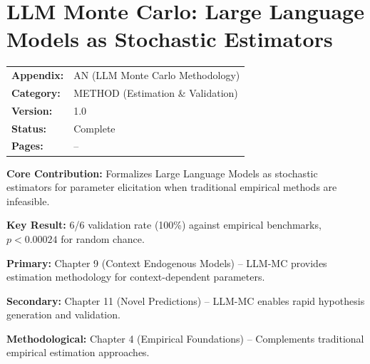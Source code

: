 \section{LLM Monte Carlo: Large Language Models as Stochastic Estimators}
\label{app:llm-monte-carlo}


\begin{tcolorbox}[colback=blue!5!white, colframe=blue!75!black,
    title=\textbf{Appendix LLM1: METHOD-LLMMC}]

\begin{tabular}{@{}ll@{}}
\textbf{Appendix:} & AN (LLM Monte Carlo Methodology) \\
\textbf{Category:} & METHOD (Estimation \& Validation) \\
\textbf{Version:} & 1.0 \\
\textbf{Status:} & Complete \\
\textbf{Pages:} & \pageref{app:llm-monte-carlo}--\pageref{sec:AN-footer} \\
\end{tabular}

\tcblower

\textbf{Core Contribution:} Formalizes Large Language Models as stochastic estimators
for parameter elicitation when traditional empirical methods are infeasible.

\textbf{Key Result:} 6/6 validation rate (100\%) against empirical benchmarks,
$p < 0.00024$ for random chance.

\end{tcolorbox}


\begin{tcolorbox}[colback=gray!10!white, colframe=gray!75!black,
    title=\textbf{Chapter Linkage}]

\textbf{Primary:} Chapter 9 (Context Endogenous Models) -- LLM-MC provides
estimation methodology for context-dependent parameters.

\textbf{Secondary:} Chapter 11 (Novel Predictions) -- LLM-MC enables rapid
hypothesis generation and validation.

\textbf{Methodological:} Chapter 4 (Empirical Foundations) -- Complements
traditional empirical estimation approaches.

\end{tcolorbox}

